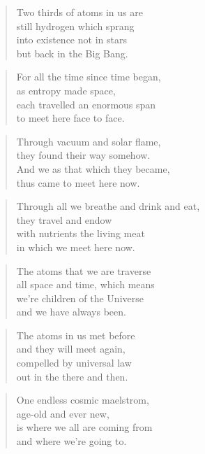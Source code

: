 \documentclass[14pt,a4paper]{article}
\begin{document}
\begin{verse}
Two thirds of atoms in us are\\
still hydrogen which sprang\\
into existence not in stars\\
but back in the Big Bang.
\end{verse}

\begin{verse}
For all the time since time began,\\
as entropy made space,\\
each travelled an enormous span\\
to meet here face to face.
\end{verse}

\begin{verse}
Through vacuum and solar flame,\\
they found their way somehow.\\
And we as that which they became,\\
thus came to meet here now.
\end{verse}

\begin{verse}
Through all we breathe and drink and eat,\\
they travel and endow\\
with nutrients the living meat\\
in which we meet here now.
\end{verse}

\begin{verse}
The atoms that we are traverse\\
all space and time, which means\\
we’re children of the Universe\\
and we have always been.
\end{verse}

\begin{verse}
The atoms in us met before\\
and they will meet again,\\
compelled by universal law\\
out in the there and then.
\end{verse}

\begin{verse}
One endless cosmic maelstrom,\\
age-old and ever new,\\
is where we all are coming from\\
and where we’re going to.
\end{verse}
\end{document}
